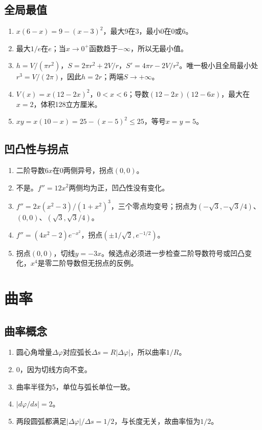 \documentclass[11pt,a4paper,fontset=fandol]{ctexrep}
\begin{document}
\subsection{全局最值}
\begin{enumerate}
\item $x(6-x)=9-(x-3)^2$，最大9在3，最小0在0或6。
\item 最大$1/e$在$e$；当$x\to0^+$函数趋于$-\infty$，所以无最小值。
\item $h=V/(\pi r^2)$，$S=2\pi r^2+2V/r$，$S'=4\pi r-2V/r^2$。唯一极小且全局最小处$r^3=V/(2\pi)$，因此$h=2r$；两端$S\to+\infty$。
\item $V(x)=x(12-2x)^2$，$0<x<6$；导数$(12-2x)(12-6x)$，最大在$x=2$，体积128立方厘米。
\item $xy=x(10-x)=25-(x-5)^2\le25$，等号$x=y=5$。
\end{enumerate}
\subsection{凹凸性与拐点}
\begin{enumerate}
\item 二阶导数$6x$在0两侧异号，拐点$(0,0)$。
\item 不是。$f''=12x^2$两侧均为正，凹凸性没有变化。
\item $f''=2x(x^2-3)/(1+x^2)^3$，三个零点均变号；拐点为$(-\sqrt3,-\sqrt3/4)$、$(0,0)$、$(\sqrt3,\sqrt3/4)$。
\item $f''=(4x^2-2)e^{-x^2}$，拐点$(\pm1/\sqrt2,e^{-1/2})$。
\item 拐点$(0,0)$，切线$y=-3x$。候选点必须进一步检查二阶导数符号或凹凸变化，$x^4$是零二阶导数但无拐点的反例。
\end{enumerate}
\section{曲率}
\subsection{曲率概念}
\begin{enumerate}
\item 圆心角增量$\Delta\varphi$对应弧长$\Delta s=R|\Delta\varphi|$，所以曲率$1/R$。
\item 0，因为切线方向不变。
\item 曲率半径为5，单位与弧长单位一致。
\item $|d\varphi/ds|=2$。
\item 两段圆弧都满足$|\Delta\varphi|/\Delta s=1/2$，与长度无关，故曲率恒为$1/2$。
\end{enumerate}
\end{document}
